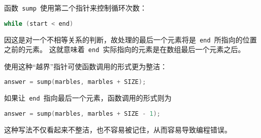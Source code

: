 \begin{frame}[fragile]
函数\lstinline| sump |使用第二个指针来控制循环次数：
\begin{lstlisting}[language=c,backgroundcolor=\color{red!20}]
while (start < end)
\end{lstlisting}
因这是对一个不相等关系的判断，故处理的最后一个元素将是\lstinline| end |所指向的位置之前的元素。
这就意味着\lstinline| end |实际指向的元素是在数组最后一个元素之后。\vspace{0.1in}\pause

\vspace{0.1in}\pause

使用这种“越界”指针可使函数调用的形式更为整洁：
\begin{lstlisting}[language=c,backgroundcolor=\color{red!20}]
answer = sump(marbles, marbles + SIZE);
\end{lstlisting}
\end{frame}

\begin{frame}[fragile]
如果让\lstinline| end |指向最后一个元素，函数调用的形式则为
\begin{lstlisting}[language=c,backgroundcolor=\color{red!20}]
answer = sump(marbles, marbles + SIZE - 1);
\end{lstlisting}
这种写法不仅看起来不整洁，也不容易被记住，从而容易导致编程错误。
\vspace{0.1in}\pause

\end{frame}

